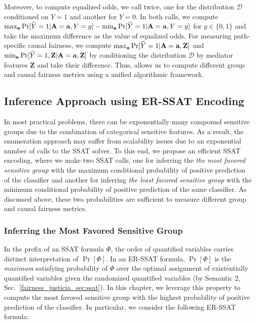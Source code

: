 Moreover, to compute equalized odds, we call {\justicia} twice, one for the distribution $ \mathcal{D} $ conditioned on $ Y = 1  $ and another for $ Y = 0 $. In both calls, we compute $ \max_{ \mathbf{a}} \Pr[\widehat{Y} =1 | \mathbf{A} = \mathbf{a}, Y = y ]  - \min_{ \mathbf{a}} \Pr[\widehat{Y} =1 | \mathbf{A} = \mathbf{a}, Y = y ] $ for $ y \in \{0,1\} $ and take the  maximum difference as the value of equalized odds. 
For measuring path-specific causal fairness, we compute  $ \max_{ \mathbf{a}} \Pr[\widehat{Y} =1 | \mathbf{A} = \mathbf{a}, \mathbf{Z}] $ and  $ \min_{ \mathbf{a}} \Pr[\widehat{Y} =1, \mathbf{Z}| \mathbf{A} = \mathbf{a} , \mathbf{Z}] $ by conditioning the distribution $ \mathcal{D} $ by mediator features $ \mathbf{Z} $ and take their difference. Thus, {\justiciaenum} allows us to compute different group and causal fairness metrics using a unified algorithmic framework.





\subsection{Inference Approach using ER-SSAT Encoding}
\label{fairness_justicia_sec:learn_ssat}
In most practical problems, there can be exponentially many compound sensitive groups due to the combination of categorical sensitive features.  As a result, the enumeration approach may suffer from scalability issues due to an exponential number of calls to the SSAT solver. To this end, we propose an efficient SSAT encoding, where we make two SSAT calls, one for inferring the \emph{the most favored sensitive group} with the maximum conditional probability of positive prediction of the classifier and another for inferring \emph{the least favored sensitive group} with the minimum conditional probability of positive prediction of the same classifier. As discussed above, these two probabilities are sufficient to measure different group and causal fairness metrics.


\subsubsection{Inferring the Most Favored Sensitive Group}
In the prefix of an SSAT formula $ \Phi $, the order of quantified variables carries distinct interpretation of  $ \Pr[\Phi] $.   In an ER-SSAT formula, $ \Pr[\Phi] $ is the \textit{maximum} satisfying probability of $ \Phi $ over the optimal assignment of existentially quantified variables given the randomized quantified variables (by Semantic 2, Sec.~\ref{fairness_justicia_sec:ssat}). In this chapter, we leverage this property to compute the most favored sensitive group with the highest probability of positive prediction of the classifier. In particular, we consider the following ER-SSAT formula:

